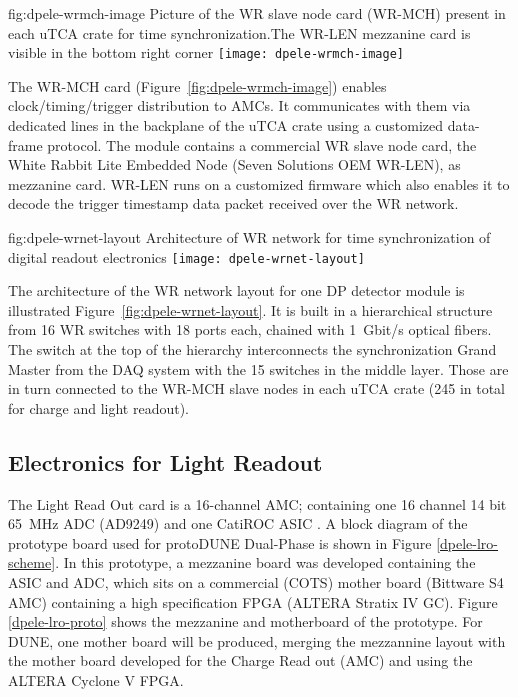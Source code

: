 \begin{dunefigure}{fig:dpele-wrmch-image}
{Picture of the WR slave node card (WR-MCH) present in each uTCA crate for time synchronization.The WR-LEN mezzanine card is visible in the bottom right corner}
\texttt{[image: dpele-wrmch-image]}
\end{dunefigure}

The WR-MCH card (Figure~\ref{fig:dpele-wrmch-image}) enables clock/timing/trigger distribution to AMCs. It communicates with them via dedicated lines in the backplane of the uTCA crate using a customized data-frame protocol. The module contains a commercial WR slave node card, the White Rabbit Lite Embedded Node (Seven Solutions OEM WR-LEN), as mezzanine card. WR-LEN runs on a customized firmware which also enables it to decode the trigger timestamp data packet received over the WR network.

\begin{dunefigure}{fig:dpele-wrnet-layout}
{Architecture of WR network for time synchronization of digital readout electronics}
\texttt{[image: dpele-wrnet-layout]}
\end{dunefigure}

The architecture of the WR network layout for one DP detector module is illustrated Figure~\ref{fig:dpele-wrnet-layout}. It is built in a hierarchical structure from \num{16} WR switches with \num{18} ports each,  chained with \SI{1}{Gbit/s} optical fibers. The switch at the top of the hierarchy interconnects the synchronization Grand Master from the DAQ system with the \num{15} switches in the middle layer. Those are in turn connected to the WR-MCH slave nodes in each uTCA crate (245 in total for charge and light readout). 


\subsection{Electronics for Light Readout}
\label{sec:fddp-tpc-elec-design-lro}

%
The Light Read Out card is a 16-channel AMC; containing one \num{16} channel \num{14} bit \SI{65}{\MHz} ADC (AD9249) and one CatiROC ASIC \cite{catiroc}. A block diagram of the prototype board used for protoDUNE Dual-Phase is shown in Figure \ref{dpele-lro-scheme}. In this prototype, a mezzanine board was developed containing the ASIC and ADC, which sits on a commercial (COTS) mother board (Bittware S4 AMC) containing a high specification FPGA (ALTERA Stratix IV GC). Figure \ref{dpele-lro-proto} shows the mezzanine and motherboard of the prototype.   For DUNE, one mother board will be produced, merging the mezzannine layout with the mother board developed for the Charge Read out (AMC) and using the ALTERA Cyclone V FPGA. 

